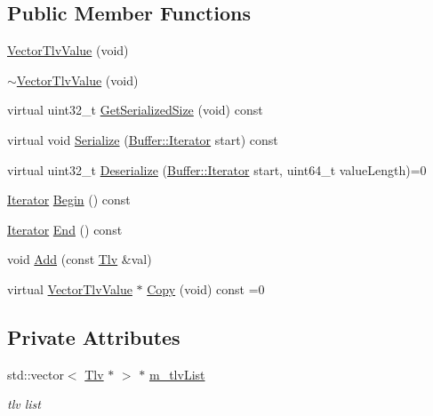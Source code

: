 \subsection*{Public Member Functions}
\begin{DoxyCompactItemize}
\item 
\hyperlink{classns3_1_1VectorTlvValue_a30ac9588cf2c8c048f702aca57a71162}{Vector\+Tlv\+Value} (void)
\item 
\hyperlink{classns3_1_1VectorTlvValue_ab6ffb07854ed7a1b8630030a056d05fb}{$\sim$\+Vector\+Tlv\+Value} (void)
\item 
virtual uint32\+\_\+t \hyperlink{classns3_1_1VectorTlvValue_a7390f0be562fedc142f83600266e0dc3}{Get\+Serialized\+Size} (void) const 
\item 
virtual void \hyperlink{classns3_1_1VectorTlvValue_ab5911d3a7cfb2563739e29c39cc255b6}{Serialize} (\hyperlink{classns3_1_1Buffer_1_1Iterator}{Buffer\+::\+Iterator} start) const 
\item 
virtual uint32\+\_\+t \hyperlink{classns3_1_1VectorTlvValue_a36f4f80c7740888f7b6b45c26e76d99e}{Deserialize} (\hyperlink{classns3_1_1Buffer_1_1Iterator}{Buffer\+::\+Iterator} start, uint64\+\_\+t value\+Length)=0
\item 
\hyperlink{classns3_1_1VectorTlvValue_a7b80a0076eb50f48943f779bb952a1e9}{Iterator} \hyperlink{classns3_1_1VectorTlvValue_abe7eaeebe0d3ca46a7813c40ec37f9aa}{Begin} () const 
\item 
\hyperlink{classns3_1_1VectorTlvValue_a7b80a0076eb50f48943f779bb952a1e9}{Iterator} \hyperlink{classns3_1_1VectorTlvValue_ade5554627d17f0ac023c922b15ec1f8e}{End} () const 
\item 
void \hyperlink{classns3_1_1VectorTlvValue_a9a422b96698c94e7bb4705026e236f35}{Add} (const \hyperlink{classns3_1_1Tlv}{Tlv} \&val)
\item 
virtual \hyperlink{classns3_1_1VectorTlvValue}{Vector\+Tlv\+Value} $\ast$ \hyperlink{classns3_1_1VectorTlvValue_aa1c25c7002f5ab66b2b2c4c01f078a95}{Copy} (void) const =0
\end{DoxyCompactItemize}
\subsection*{Private Attributes}
\begin{DoxyCompactItemize}
\item 
std\+::vector$<$ \hyperlink{classns3_1_1Tlv}{Tlv} $\ast$ $>$ $\ast$ \hyperlink{classns3_1_1VectorTlvValue_ad49d4f89485ab15535336e8cea6bd20c}{m\+\_\+tlv\+List}
\begin{DoxyCompactList}\small\item\em tlv list \end{DoxyCompactList}\end{DoxyCompactItemize}


